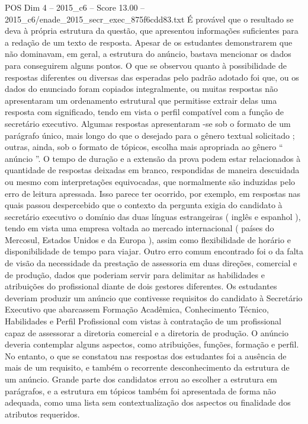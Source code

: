 \begin{textsample}{POS Dim 4 – 2015\_c6 – Score 13.00 – 2015\_c6/enade\_2015\_secr\_exec\_875f6cdd83.txt}
É provável que o resultado se deva à própria estrutura da questão, que apresentou informações suficientes para a redação de um texto de resposta.
Apesar de os estudantes demonstrarem que não dominavam, em geral, a estrutura do anúncio, bastava mencionar os dados para conseguirem alguns pontos.
O que se observou quanto à possibilidade de respostas diferentes ou diversas das esperadas pelo padrão adotado foi que, ou os dados do enunciado foram copiados integralmente, ou muitas respostas não apresentaram um ordenamento estrutural que permitisse extrair delas uma resposta com significado, tendo em vista o perfil compatível com a função de secretário executivo.
Algumas respostas apresentaram -se sob o formato de um parágrafo único, mais longo do que o desejado para o gênero textual solicitado ; outras, ainda, sob o formato de tópicos, escolha mais apropriada ao gênero “ anúncio ”.
O tempo de duração e a extensão da prova podem estar relacionados à quantidade de respostas deixadas em branco, respondidas de maneira descuidada ou mesmo com interpretações equivocadas, que normalmente são induzidas pelo erro de leitura apressada.
Isso parece ter ocorrido, por exemplo, em respostas nas quais passou despercebido que o contexto da pergunta exigia do candidato à secretário executivo o domínio das duas línguas estrangeiras ( inglês e espanhol ), tendo em vista uma empresa voltada ao mercado internacional ( países do Mercosul, Estados Unidos e da Europa ), assim como flexibilidade de horário e disponibilidade de tempo para viajar.
Outro erro comum encontrado foi o da falta de visão da necessidade da prestação de assessoria em duas direções, comercial e de produção, dados que poderiam servir para delimitar as habilidades e atribuições do profissional diante de dois gestores diferentes.
Os estudantes deveriam produzir um anúncio que contivesse requisitos do candidato à Secretário Executivo que abarcassem Formação Acadêmica, Conhecimento Técnico, Habilidades e Perfil Profissional com vistas à contratação de um profissional capaz de assessorar a diretoria comercial e a diretoria de produção.
O anúncio deveria contemplar alguns aspectos, como atribuições, funções, formação e perfil.
No entanto, o que se constatou nas respostas dos estudantes foi a ausência de mais de um requisito, e também o recorrente desconhecimento da estrutura de um anúncio.
Grande parte dos candidatos errou ao escolher a estrutura em parágrafos, e a estrutura em tópicos também foi apresentada de forma não adequada, como uma lista sem contextualização dos aspectos ou finalidade dos atributos requeridos.

\end{textsample}
